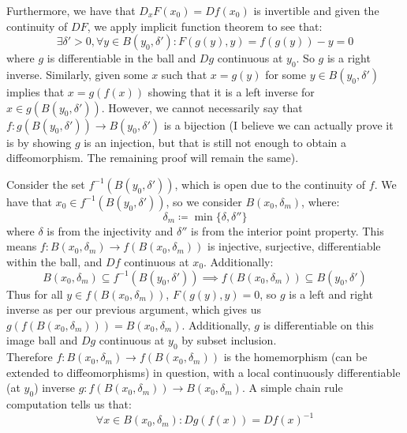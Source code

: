 \documentclass[10pt,letterpaper]{article} %
\begin{document}
Furthermore, we have that $D_xF(x_0) = Df(x_0)$ is invertible and given the continuity of $DF$, we apply implicit function theorem to see that:
\begin{equation*}
\exists \delta' > 0, \forall y \in B(y_0, \delta'): F(g(y), y) = f(g(y)) - y = 0
\end{equation*}
where $g$ is differentiable in the ball and $Dg$ continuous at $y_0$. So $g$ is a right inverse. Similarly, given some $x$ such that $x = g(y)$ for some $y \in B(y_0, \delta')$ implies that $x = g(f(x))$ showing that it is a left inverse for $x \in g(B(y_0, \delta'))$. However, we cannot necessarily say that $f: g(B(y_0, \delta')) \xrightarrow{} B(y_0, \delta')$ is a bijection (I believe we can actually prove it is by showing $g$ is an injection, but that is still not enough to obtain a diffeomorphism. The remaining proof will remain the same).

Consider the set $f^{-1}(B(y_0, \delta'))$, which is open due to the continuity of $f$. We have that $x_0 \in f^{-1}(B(y_0, \delta'))$, so we consider $B(x_0, \delta_m)$, where:
\begin{equation*}
\delta_m \coloneq \min\{\delta, \delta''\}
\end{equation*}
where $\delta$ is from the injectivity and $\delta''$ is from the interior point property. This means $f: B(x_0, \delta_m) \xrightarrow{} f(B(x_0, \delta_m))$ is injective, surjective, differentiable within the ball, and $Df$ continuous at $x_0$. Additionally:
\begin{equation*}
B(x_0, \delta_m) \subseteq f^{-1}(B(y_0, \delta')) \implies f(B(x_0, \delta_m)) \subseteq B(y_0, \delta')
\end{equation*}
Thus for all $y \in f(B(x_0, \delta_m))$, $F(g(y), y) = 0$, so $g$ is a left and right inverse as per our previous argument, which gives us $g(f(B(x_0, \delta_m))) = B(x_0, \delta_m)$. Additionally, $g$ is differentiable on this image ball and $Dg$ continuous at $y_0$ by subset inclusion.\\

Therefore $f: B(x_0, \delta_m) \xrightarrow{} f(B(x_0, \delta_m))$ is the homemorphism (can be extended to diffeomorphisms) in question, with a local continuously differentiable (at $y_0$) inverse $g: f(B(x_0, \delta_m)) \xrightarrow{} B(x_0, \delta_m)$. A simple chain rule computation tells us that:
\begin{equation*}
\forall x \in B(x_0, \delta_m): Dg(f(x)) = Df(x)^{-1}
\end{equation*}
\end{document}
